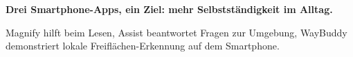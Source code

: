 \begin{PosterHighlight}
\centering
{\huge\bfseries\color{PosterPrimary}Drei Smartphone-Apps, ein Ziel: mehr Selbstständigkeit im Alltag.}\par\vspace{3mm}
{\LARGE
Magnify hilft beim Lesen, Assist beantwortet Fragen zur Umgebung, WayBuddy demonstriert lokale Freiflächen-Erkennung auf dem Smartphone.
}
\end{PosterHighlight}
